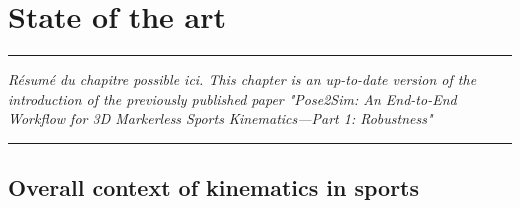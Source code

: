 
\lhead[\fancyplain{}{\leftmark}]%
      {\fancyplain{}{}} %
\chead[\fancyplain{}{}]%
      {\fancyplain{}{}}
\rhead[\fancyplain{}{}]%
      {\fancyplain{}{\rightmark}}%
\lfoot[\fancyplain{}{}]%
      {\fancyplain{}{}}
\cfoot[\fancyplain{}{\thepage}]%
      {\fancyplain{}{\thepage}} %
\rfoot[\fancyplain{}{}]%
     {\fancyplain{}{\scriptsize}}



\chapter{State of the art}
\label{ch:1}


\begin{center}
\rule{0.7\linewidth}{.5pt}
\begin{minipage}{0.7\linewidth}
\smallskip

\textit{Résumé du chapitre possible ici.\newline \newline
This chapter is an up-to-date version of the introduction of the previously published paper "Pose2Sim: An End-to-End Workflow for 3D Markerless Sports Kinematics—Part 1: Robustness" \cite{Pagnon2021} }

\end{minipage}
\smallskip
\rule{0.7\linewidth}{.5pt}
\end{center}

\minitoc
\newpage



\section{Overall context of kinematics in sports}

